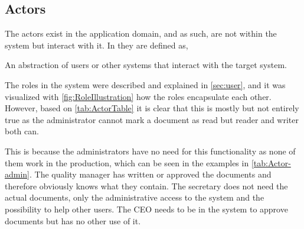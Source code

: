 \subsection{Actors}\label{sec:Actors}
The actors exist in the application domain, and as such, are not within the system but interact with it.
In \citep[p.~121]{Rod-Aalborg} they are defined as,

\begin{defn}
An abstraction of users or other systems that interact with the target system. 
\end{defn}

The roles in the system were described and explained in \cref{sec:user}, and it was visualized with \cref{fig:RoleIllustration} how the roles encapsulate each other.
However, based on \cref{tab:ActorTable} it is clear that this is mostly but not entirely true as the administrator cannot mark a document as read but reader and writer both can.

This is because the administrators have no need for this functionality as none of them work in the production, which can be seen in the examples in \cref{tab:Actor-admin}.
The quality manager has written or approved the documents and therefore obviously knows what they contain.
The secretary does not need the actual documents, only the administrative access to the system and the possibility to help other users.
The CEO needs to be in the system to approve documents but has no other use of it.

